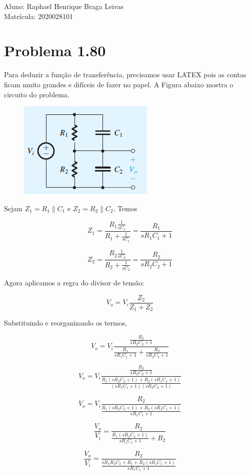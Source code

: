\documentclass[12pt]{scrartcl}
\begin{document}

Aluno: Raphael Henrique Braga Leivas \\
Matrícula: 2020028101

\section*{Problema 1.80}

Para deduzir a função de transferência, precisamos usar LATEX pois as contas ficam muito grandes e difíceis de fazer no papel.
A Figura abaixo mostra o circuito do problema.

\begin{figure}[h!]
    \label{fig:P1.80_enunciado}
    \centering
    \includegraphics[scale=1.0]{P.1.80_enunciado.png}
\end{figure}

Sejam $Z_1 = R_1 \parallel C_1$ e $Z_2 = R_2 \parallel C_2$. Temos

\[ Z_1 = \frac{R_1\frac{1}{sC_1}}{R_1 + \frac{1}{sC_1}} = \frac{R_1}{sR_1C_1 + 1} \]

\[ Z_2 = \frac{R_2\frac{1}{sC_2}}{R_2 + \frac{1}{sC_2}} = \frac{R_2}{sR_2C_2 + 1} \]

Agora aplicamos a regra do divisor de tensão:

\[ V_o = V_i \frac{Z_2}{Z_1 + Z_2} \]

Substituindo e reorganizando os termos,

\[ V_o = V_i \frac{\frac{R_2}{sR_2C_2 + 1}}{\frac{R_1}{sR_1C_1 + 1} + \frac{R_2}{sR_2C_2 + 1}}  \]

\[ V_o = V_i \frac{\frac{R_2}{sR_2C_2 + 1}}{\frac{R_1(sR_2C_2 + 1) + R_2(sR_1C_1 + 1)}{(sR_1C_1 + 1)(sR_2C_2 + 1)}}  \]

\[ V_o = V_i \frac{R_2}{\frac{R_1(sR_2C_2 + 1) + R_2(sR_1C_1 + 1)}{sR_1C_1 + 1}}  \]

\[ \frac{V_o}{V_i} = \frac{R_2}{\frac{R_1(sR_2C_2 + 1)}{sR_1C_1 + 1} + R_2}  \]

\[ \frac{V_o}{V_i} = \frac{R_2}{\frac{sR_1R_2C_2 + R_1 + R_2(sR_1C_1 + 1)}{sR_1C_1 + 1}}  \]
\end{document}
